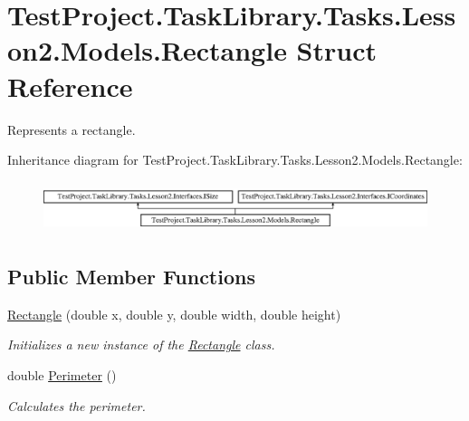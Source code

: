 \hypertarget{struct_test_project_1_1_task_library_1_1_tasks_1_1_lesson2_1_1_models_1_1_rectangle}{}\section{Test\+Project.\+Task\+Library.\+Tasks.\+Lesson2.\+Models.\+Rectangle Struct Reference}
\label{struct_test_project_1_1_task_library_1_1_tasks_1_1_lesson2_1_1_models_1_1_rectangle}


Represents a rectangle.  


Inheritance diagram for Test\+Project.\+Task\+Library.\+Tasks.\+Lesson2.\+Models.\+Rectangle\+:\begin{figure}[H]
\begin{center}
\leavevmode
\includegraphics[height=1.489362cm]{struct_test_project_1_1_task_library_1_1_tasks_1_1_lesson2_1_1_models_1_1_rectangle}
\end{center}
\end{figure}
\subsection*{Public Member Functions}
\begin{DoxyCompactItemize}
\item 
\mbox{\hyperlink{struct_test_project_1_1_task_library_1_1_tasks_1_1_lesson2_1_1_models_1_1_rectangle_a980804ab5a70c2562c4587dfce5f2c12}{Rectangle}} (double x, double y, double width, double height)
\begin{DoxyCompactList}\small\item\em Initializes a new instance of the \mbox{\hyperlink{struct_test_project_1_1_task_library_1_1_tasks_1_1_lesson2_1_1_models_1_1_rectangle}{Rectangle}} class. \end{DoxyCompactList}\item 
double \mbox{\hyperlink{struct_test_project_1_1_task_library_1_1_tasks_1_1_lesson2_1_1_models_1_1_rectangle_a8a4e6ef021013964d15b6c2fb906a1d1}{Perimeter}} ()
\begin{DoxyCompactList}\small\item\em Calculates the perimeter. \end{DoxyCompactList}\end{DoxyCompactItemize}

